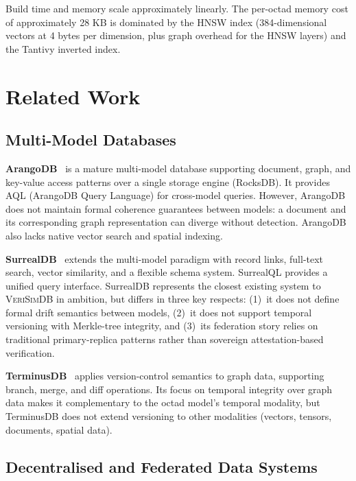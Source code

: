 \documentclass[11pt,twocolumn]{article}
\newcommand{\verisimdb}{\textsc{VeriSimDB}\xspace}
\begin{document}
Build time and memory scale approximately linearly.  The per-octad memory
cost of approximately 28 KB is dominated by the HNSW index (384-dimensional
vectors at 4 bytes per dimension, plus graph overhead for the HNSW layers)
and the Tantivy inverted index.

\section{Related Work}\label{sec:related}

\subsection{Multi-Model Databases}

\textbf{ArangoDB}~\cite{arangodb2023} is a mature multi-model database
supporting document, graph, and key-value access patterns over a single
storage engine (RocksDB).  It provides AQL (ArangoDB Query Language) for
cross-model queries.  However, ArangoDB does not maintain formal coherence
guarantees between models: a document and its corresponding graph
representation can diverge without detection.  ArangoDB also lacks native
vector search and spatial indexing.

\textbf{SurrealDB}~\cite{surrealdb2024} extends the multi-model paradigm
with record links, full-text search, vector similarity, and a flexible
schema system.  SurrealQL provides a unified query interface.  SurrealDB
represents the closest existing system to \verisimdb in ambition, but differs
in three key respects: (1)~it does not define formal drift semantics between
models, (2)~it does not support temporal versioning with Merkle-tree
integrity, and (3)~its federation story relies on traditional
primary-replica patterns rather than sovereign attestation-based verification.

\textbf{TerminusDB}~\cite{terminusdb2023} applies version-control semantics
to graph data, supporting branch, merge, and diff operations.  Its focus on
temporal integrity over graph data makes it complementary to the octad model's
temporal modality, but TerminusDB does not extend versioning to other
modalities (vectors, tensors, documents, spatial data).

\subsection{Decentralised and Federated Data Systems}
\end{document}
